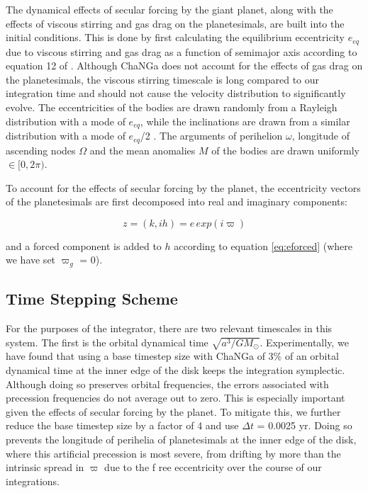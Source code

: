 \documentclass[twocolumn]{aastex63}
\begin{document}
The dynamical effects of secular forcing by the giant planet, along with  the effects of viscous stirring and gas drag on the planetesimals, are 
built into the initial conditions. This is done by first calculating the equilibrium eccentricity $e_{eq}$ due to viscous stirring and gas drag as a 
function of semimajor axis according to equation 12 of \citet{2002ApJ...581..666K}. Although {\sc ChaNGa} does not account for the effects of 
gas drag on the planetesimals, the viscous stirring timescale is long compared to our integration time and should not cause the velocity 
distribution to significantly evolve. The eccentricities of the bodies are drawn randomly from a Rayleigh distribution with a mode of $e_{eq}$, 
while the inclinations are drawn from a similar distribution with a mode of $e_{eq}$/2 \citep{1993MNRAS.263..875I}. The arguments of perihelion 
$\omega$, longitude of ascending nodes $\Omega$ and the mean anomalies $M$ of the bodies are drawn uniformly $\in [0, 2 \pi)$.

To account for the effects of secular forcing by the planet, the eccentricity vectors of the planetesimals are first decomposed into real and imaginary 
components:

\begin{equation}\label{eq:kh}
	z = (k, ih) = e \, exp(i \varpi)
\end{equation}

\noindent and a forced component is added to $h$ according to equation \ref{eq:eforced} (where we have set $\varpi_{g}$ = 0).

\subsection{Time Stepping Scheme}\label{sec:timestep}

For the purposes of the integrator, there are two relevant timescales in this system. The first is the orbital dynamical time $\sqrt{a^3/
G M_{\odot}}$. Experimentally, we have found that using a base timestep size with {\sc ChaNGa} of 3\% of an orbital dynamical time
at the inner edge of the disk keeps the integration symplectic. Although doing so preserves orbital frequencies, the errors associated with
precession frequencies do not average out to zero. This is especially important given the effects of secular forcing by the planet. To mitigate
this, we further reduce the base timestep size by a factor of 4 and use $\Delta t$ = 0.0025 yr. Doing so prevents the longitude of perihelia of
planetesimals at the inner edge of the disk, where this artificial precession is most severe, from drifting by more than the intrinsic spread in $\varpi$ due to the f
ree eccentricity over the course of our integrations.
\end{document}
